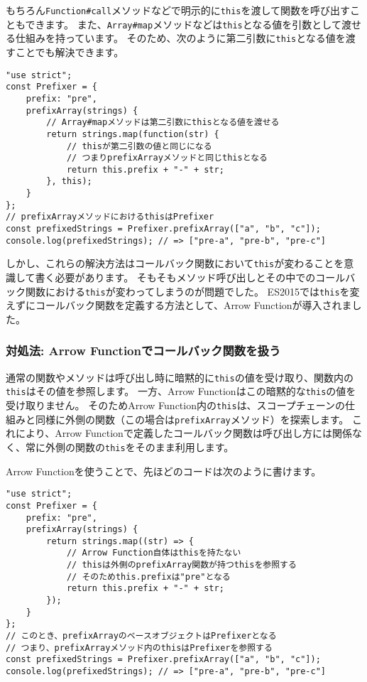 もちろん\texttt{Function\#call}メソッドなどで明示的に\texttt{this}を渡して関数を呼び出すこともできます。
また、\texttt{Array\#map}メソッドなどは\texttt{this}となる値を引数として渡せる仕組みを持っています。
そのため、次のように第二引数に\texttt{this}となる値を渡すことでも解決できます。

\begin{lstlisting}
"use strict";
const Prefixer = {
    prefix: "pre",
    prefixArray(strings) {
        // Array#mapメソッドは第二引数にthisとなる値を渡せる
        return strings.map(function(str) {
            // thisが第二引数の値と同じになる
            // つまりprefixArrayメソッドと同じthisとなる
            return this.prefix + "-" + str;
        }, this);
    }
};
// prefixArrayメソッドにおけるthisはPrefixer
const prefixedStrings = Prefixer.prefixArray(["a", "b", "c"]);
console.log(prefixedStrings); // => ["pre-a", "pre-b", "pre-c"]
\end{lstlisting}

しかし、これらの解決方法はコールバック関数において\texttt{this}が変わることを意識して書く必要があります。
そもそもメソッド呼び出しとその中でのコールバック関数における\texttt{this}が変わってしまうのが問題でした。
ES2015では\texttt{this}を変えずにコールバック関数を定義する方法として、Arrow
Functionが導入されました。

\hypertarget{arrow-function-callback}{%
\subsubsection{対処法: Arrow
Functionでコールバック関数を扱う}\label{arrow-function-callback}}

通常の関数やメソッドは呼び出し時に暗黙的に\texttt{this}の値を受け取り、関数内の\texttt{this}はその値を参照します。
一方、Arrow
Functionはこの暗黙的な\texttt{this}の値を受け取りません。
そのためArrow
Function内の\texttt{this}は、スコープチェーンの仕組みと同様に外側の関数（この場合は\texttt{prefixArray}メソッド）を探索します。
これにより、Arrow
Functionで定義したコールバック関数は呼び出し方には関係なく、常に外側の関数の\texttt{this}をそのまま利用します。

Arrow Functionを使うことで、先ほどのコードは次のように書けます。

\begin{lstlisting}
"use strict";
const Prefixer = {
    prefix: "pre",
    prefixArray(strings) {
        return strings.map((str) => {
            // Arrow Function自体はthisを持たない
            // thisは外側のprefixArray関数が持つthisを参照する
            // そのためthis.prefixは"pre"となる
            return this.prefix + "-" + str;
        });
    }
};
// このとき、prefixArrayのベースオブジェクトはPrefixerとなる
// つまり、prefixArrayメソッド内のthisはPrefixerを参照する
const prefixedStrings = Prefixer.prefixArray(["a", "b", "c"]);
console.log(prefixedStrings); // => ["pre-a", "pre-b", "pre-c"]
\end{lstlisting}

